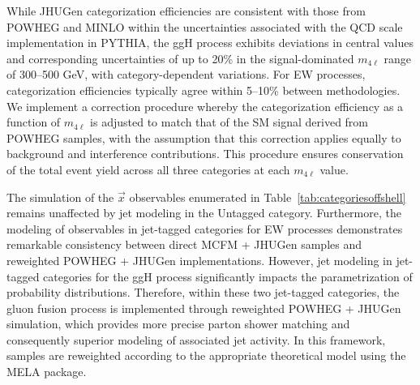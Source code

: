 While JHUGen categorization efficiencies are consistent with those from POWHEG and MINLO within the uncertainties associated with the QCD scale implementation in PYTHIA,
the ggH process exhibits deviations in central values and corresponding uncertainties of up to 20\% in the signal-dominated $m_{4\ell}$ range of 300--500 GeV, with category-dependent variations. 
For EW processes, categorization efficiencies typically agree within 5--10\% between methodologies. 
We implement a correction procedure whereby the categorization efficiency as a function of $m_{4\ell}$ is adjusted to match that of the SM signal derived from POWHEG samples, with the assumption that this correction applies equally to background and interference contributions. 
This procedure ensures conservation of the total event yield across all three categories at each $m_{4\ell}$ value.

The simulation of the $\vec{x}$ observables enumerated in Table~\ref{tab:categoriesoffshell} remains unaffected by jet modeling in the Untagged category. Furthermore, the modeling of observables in jet-tagged categories for EW processes demonstrates remarkable consistency between direct MCFM + JHUGen samples and reweighted POWHEG + JHUGen implementations. 
However, jet modeling in jet-tagged categories for the ggH process significantly impacts the parametrization of probability distributions. Therefore, within these two jet-tagged categories, the gluon fusion process is implemented through reweighted POWHEG + JHUGen simulation, which provides more precise parton shower matching and consequently superior modeling of associated jet activity. In this framework, samples are reweighted according to the appropriate theoretical model using the MELA package.



